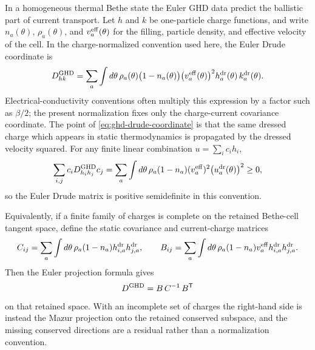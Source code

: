 \begin{remark}
\label{rem:ghd-drude-weight-reconstruction-proof-obligation-map}
In a homogeneous thermal Bethe state the Euler GHD data predict the ballistic
part of current transport.  Let \(h\) and \(k\) be one-particle charge
functions, and write \(n_a(\theta)\), \(\rho_a(\theta)\), and
\(v_a^{\rm eff}(\theta)\) for the filling, particle density, and effective
velocity of the cell.  In the charge-normalized convention used here, the
Euler Drude coordinate is
\begin{equation}
  D_{hk}^{\rm GHD}
  =
  \sum_a\int d\theta\,
  \rho_a(\theta)\bigl(1-n_a(\theta)\bigr)
  \bigl(v_a^{\rm eff}(\theta)\bigr)^2
  h_a^{\rm dr}(\theta)\,k_a^{\rm dr}(\theta).
  \label{eq:ghd-drude-coordinate}
\end{equation}
Electrical-conductivity conventions often multiply this expression by a
factor such as \(\beta/2\); the present normalization fixes only the
charge-current covariance coordinate.  The point of
\eqref{eq:ghd-drude-coordinate} is that the same dressed charge which appears
in static thermodynamics is propagated by the dressed velocity squared.  For
any finite linear combination \(u=\sum_i c_i h_i\),
\[
  \sum_{i,j}c_iD_{h_i h_j}^{\rm GHD}c_j
  =
  \sum_a\int d\theta\,
  \rho_a(1-n_a)(v_a^{\rm eff})^2
  \bigl(u_a^{\rm dr}(\theta)\bigr)^2
  \ge0 ,
\]
so the Euler Drude matrix is positive semidefinite in this convention.

Equivalently, if a finite family of charges is complete on the retained
Bethe-cell tangent space, define the static covariance and current-charge
matrices
\[
  C_{ij}
  =
  \sum_a\int d\theta\,
  \rho_a(1-n_a)h_{i,a}^{\rm dr}h_{j,a}^{\rm dr},
  \qquad
  B_{ij}
  =
  \sum_a\int d\theta\,
  \rho_a(1-n_a)v_a^{\rm eff}
  h_{i,a}^{\rm dr}h_{j,a}^{\rm dr}.
\]
Then the Euler projection formula gives
\begin{equation}
  D^{\rm GHD}=B\,C^{-1}\,B^{\mathsf T}
  \label{eq:ghd-drude-projection-formula}
\end{equation}
on that retained space.  With an incomplete set of charges the right-hand
side is instead the Mazur projection onto the retained conserved subspace,
and the missing conserved directions are a residual rather than a
normalization convention.


\end{remark}
